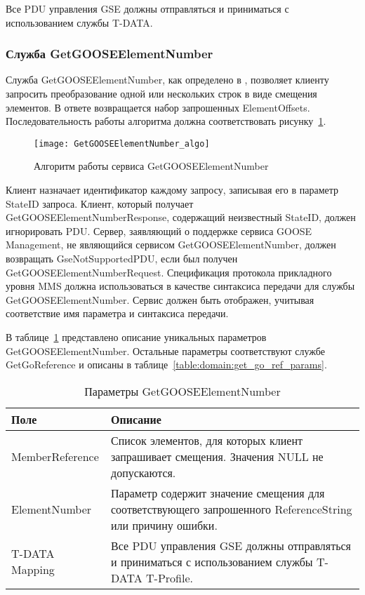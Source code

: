 Все PDU управления GSE должны отправляться и приниматься с использованием службы
T-DATA.

\subsubsection{Служба GetGOOSEElementNumber}

Служба GetGOOSEElementNumber, как определено в , позволяет клиенту
запросить преобразование одной или нескольких строк в виде смещения элементов.
В ответе возвращается набор запрошенных ElementOffsets. Последовательность работы
алгоритма должна соответствовать рисунку~\ref{pic::domain::get_goose_elem_num_algo}.

\begin{figure}[ht]
    \centering
    \texttt{[image: GetGOOSEElementNumber\_algo]}
    \caption{Алгоритм работы сервиса GetGOOSEElementNumber}
    \label{pic::domain::get_goose_elem_num_algo}
\end{figure}

Клиент назначает идентификатор каждому запросу, записывая его в параметр StateID
запроса. Клиент, который получает GetGOOSEElementNumberResponse, содержащий
неизвестный StateID, должен игнорировать PDU. Сервер, заявляющий о поддержке
сервиса GOOSE Management, не являющийся сервисом GetGOOSEElementNumber,
должен возвращать GseNotSupportedPDU, если был получен GetGOOSEElementNumberRequest.
Спецификация протокола прикладного уровня MMS должна использоваться в качестве
синтаксиса передачи для службы GetGOOSEElementNumber.
Сервис должен быть отображен, учитывая соответствие имя параметра
и синтаксиса передачи.

В таблице~\ref{table:domain:get_goose_elem_number_params} представлено описание
уникальных параметров GetGOOSEElementNumber. Остальные параметры соответствуют службе
GetGoReference и описаны в таблице~\ref{table:domain:get_go_ref_params}.

\begin{table}[ht]
    \caption{Параметры GetGOOSEElementNumber}
    \label{table:domain:get_goose_elem_number_params}
    \begin{tabular}{| >{\raggedright}m{}
                    | >{\raggedright\arraybackslash}m{}|}
        \hline
        \centering Поле & \centering\arraybackslash Описание \\

        \hline
        MemberReference & Список элементов, для которых клиент запрашивает смещения. Значения NULL не допускаются. \\

        \hline
        ElementNumber & Параметр содержит значение смещения для соответствующего
        запрошенного ReferenceString или причину ошибки. \\

        \hline
        T-DATA Mapping & Все PDU управления GSE должны отправляться и приниматься
        с использованием службы T-DATA T-Profile. \\

        \hline
    \end{tabular}
\end{table}

